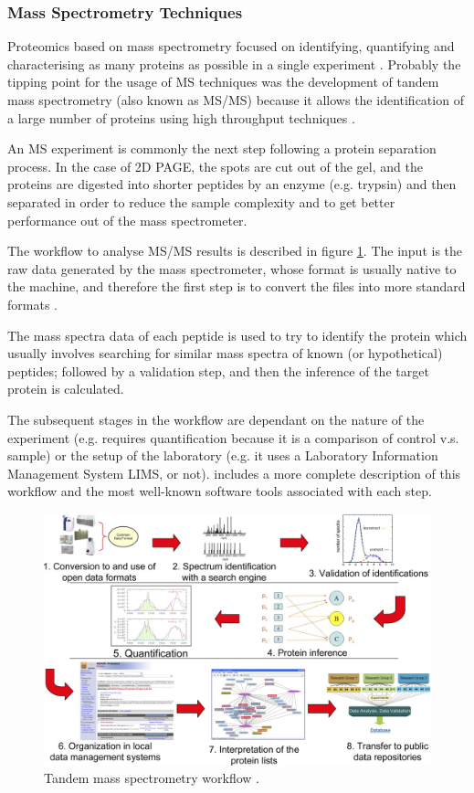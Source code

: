 \subsubsection{Mass Spectrometry Techniques}
Proteomics based on mass spectrometry focused on identifying, quantifying and characterising as many proteins as possible in a single experiment . Probably the tipping point for the usage of MS techniques was the development of tandem mass spectrometry (also known as MS/MS) because it allows the identification of a large number of proteins using high throughput techniques \cite{PAN2008}.

An MS experiment is commonly the next step following a protein separation process. In the case of 2D PAGE, the spots are cut out of the gel, and the proteins are digested into shorter peptides by an enzyme (e.g. trypsin) and then separated in order to reduce the sample complexity and to get better performance out of the mass spectrometer.

The workflow to analyse MS/MS results is described in figure \ref{fig:ms_workflow}. The input is the raw data generated by the mass spectrometer, whose format is usually native to the machine, and therefore the first step is to convert the files into more standard formats \cite{DEU2008}. 

The mass spectra data of each peptide is used to try to identify the protein which usually involves searching for similar mass spectra of known (or hypothetical) peptides; followed by a validation step, and then the inference of the target protein is calculated.

The subsequent stages in the workflow are dependant on the nature of the experiment (e.g. requires quantification because it is a comparison of control v.s. sample) or the setup of the laboratory (e.g. it uses a Laboratory Information Management System LIMS, or not). \cite{DEU2008} includes a more complete description of this workflow and the most well-known software tools associated with each step.

\begin{figure}  
\centering
\includegraphics[width=6in]{figures/ms_workflow.png}
\caption[Tandem mass spectrometry workflow.]{Tandem mass spectrometry workflow \cite{DEU2008}.
\label{fig:ms_workflow}}
\end{figure}


